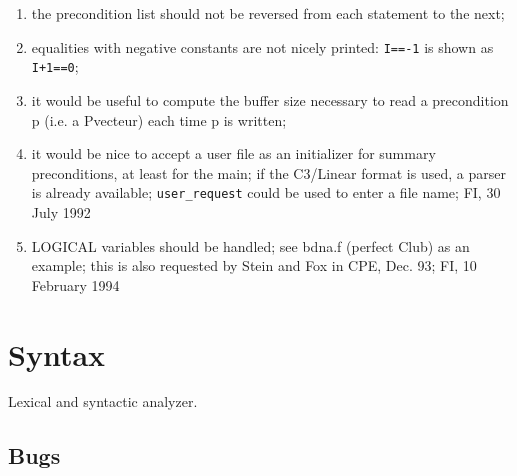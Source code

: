 \begin{enumerate}

  \item the precondition list should not be reversed from each statement
        to the next;

  \item equalities with negative constants are not nicely printed:
        \verb+I==-1+ is shown as \verb/I+1==0/;

  \item it would be useful to compute the buffer size necessary to
        read a precondition p (i.e. a Pvecteur) each time p is
        written;

  \item it would be nice to accept a user file as an initializer for
        summary preconditions, at least for the main; if the C3/Linear
        format is used, a parser is already available; \verb+user_request+
        could be used to enter a file name; FI, 30 July 1992

  \item LOGICAL variables should be handled; see bdna.f (perfect Club)
        as an example; this is also requested by Stein and Fox in CPE,
        Dec. 93; FI, 10 February 1994

\end{enumerate}

\section{Syntax}

Lexical and syntactic analyzer. 

%

\subsection{Bugs}

